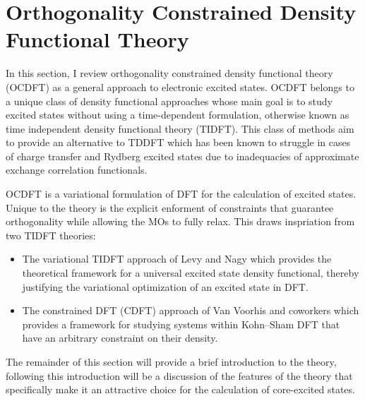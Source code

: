 \documentclass{article}
\begin{document}
\section{Orthogonality Constrained Density Functional Theory}
In this section, I review orthogonality constrained density functional theory (OCDFT) as a general approach to electronic excited states. OCDFT belongs to a unique class of density functional approaches whose main goal is to study excited states without using a time-dependent formulation, otherwise known as time independent density functional theory (TIDFT). \cite{samal_exploring_2006,ayers_time-independent_2009} This class of methods aim to provide an alternative to TDDFT which has been known to struggle in cases of charge transfer and Rydberg excited states due to inadequacies of approximate exchange correlation functionals. \cite{zhang_challenge_1998,cohen_insights_2008}

OCDFT is a variational formulation of DFT for the calculation of excited states.\cite{evangelista_orthogonality_2013} Unique to the theory is the explicit enforment of constraints that guarantee orthogonality while allowing the MOs to fully relax. This draws inspriation from two TIDFT theories: 
\begin{itemize}
\item The variational TIDFT approach of Levy and Nagy which provides the theoretical framework for a universal excited state density functional,\cite{ayers_time-independent_2012} thereby justifying the variational optimization of an excited state in DFT.
\item The constrained DFT (CDFT) approach of Van Voorhis and coworkers \cite{kaduk_constrained_2012} which provides a framework for studying systems within Kohn--Sham DFT that have an arbitrary constraint on their density.
\end{itemize} 
The remainder of this section will provide a brief introduction to the theory, following this introduction will be a discussion of the features of the theory that specifically make it an attractive choice for the calculation of core-excited states.
\end{document}
